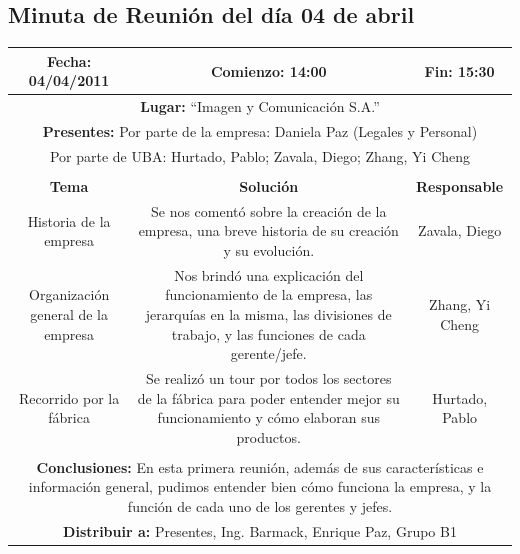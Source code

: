\documentclass[a4paper,10pt,titlepage]{article}
\begin{document}
\subsection{Minuta de Reuni\'on del d\'ia 04 de abril}
\vspace{1cm}
\begin{center}
\begin{tabular}{|c|c|c|}
	\hline
	\textbf{Fecha:} 04/04/2011 &  \textbf{Comienzo:} 14:00  &  \textbf{Fin:} 15:30 \\ \hline	

	\multicolumn{3}{|c|}{\textbf{Lugar:} ``Imagen y Comunicaci\'on S.A.''} \\
	\hline \multicolumn{3}{|p{0.86\linewidth}|}{\textbf{Presentes:} Por parte de la empresa: Daniela Paz (Legales y Personal)}  \\
	\multicolumn{3}{|p{0.86\linewidth}|}{Por parte de UBA:  Hurtado, Pablo; Zavala, Diego; Zhang, Yi Cheng} \\
	\hline
    \rowcolor[gray]{0.8} & & \\
    \hline
    \textbf{Tema} & \textbf{Solución} & \textbf{Responsable}\\
    \hline
    \multicolumn{1}{|p{0.33\linewidth}|}{Historia de la empresa} & \multicolumn{1}{p{0.33\linewidth}|}{Se nos coment\'o sobre la creaci\'on de la empresa, una breve historia de su creaci\'on y su evoluci\'on.} & \multicolumn{1}{p{0.20\linewidth}|}{Zavala, Diego}\\\hline
    \multicolumn{1}{|p{0.33\linewidth}|}{Organizaci\'on general de la empresa} & \multicolumn{1}{p{0.33\linewidth}|}{Nos brind\'o una explicaci\'on del funcionamiento de la empresa, las jerarqu\'ias en la misma, las divisiones de trabajo, y las funciones de cada gerente/jefe.} & \multicolumn{1}{p{0.20\linewidth}|}{Zhang, Yi Cheng}\\\hline
    \multicolumn{1}{|p{0.33\linewidth}|}{Recorrido por la f\'abrica} & \multicolumn{1}{p{0.33\linewidth}|}{Se realiz\'o un tour por todos los sectores de la f\'abrica para poder entender mejor su funcionamiento y c\'omo elaboran sus productos.} & \multicolumn{1}{p{0.20\linewidth}|}{Hurtado, Pablo}\\\hline
    \rowcolor[gray]{0.8} & & \\\hline
    \multicolumn{3}{|p{0.86\linewidth}|}{\textbf{Conclusiones:} En esta primera reuni\'on, adem\'as de sus caracter\'isticas e informaci\'on general, pudimos entender bien c\'omo funciona la empresa, y la funci\'on de cada uno de los gerentes y jefes.}\\\hline
    \multicolumn{3}{|p{0.86\linewidth}|}{\textbf{Distribuir a:} Presentes, Ing. Barmack, Enrique Paz, Grupo B1}\\\hline
\end{tabular} 
\end{center}
\end{document}
